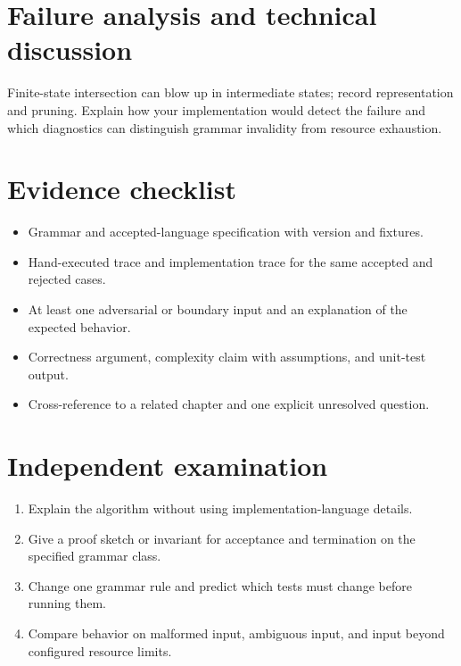\documentclass[11pt,letterpaper]{article}
\begin{document}
\section{Failure analysis and technical discussion}
Finite-state intersection can blow up in intermediate states; record representation and pruning. Explain how your implementation would detect the failure and which diagnostics can distinguish grammar invalidity from resource exhaustion.
\section{Evidence checklist}
\begin{itemize}
\item Grammar and accepted-language specification with version and fixtures.
\item Hand-executed trace and implementation trace for the same accepted and rejected cases.
\item At least one adversarial or boundary input and an explanation of the expected behavior.
\item Correctness argument, complexity claim with assumptions, and unit-test output.
\item Cross-reference to a related chapter and one explicit unresolved question.
\end{itemize}
\section{Independent examination}
\begin{enumerate}
\item Explain the algorithm without using implementation-language details.
\item Give a proof sketch or invariant for acceptance and termination on the specified grammar class.
\item Change one grammar rule and predict which tests must change before running them.
\item Compare behavior on malformed input, ambiguous input, and input beyond configured resource limits.
\end{enumerate}
\end{document}
